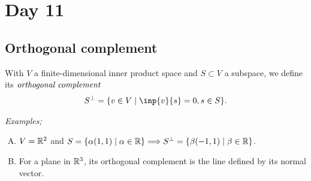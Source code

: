 
\pagebreak
\section{Day 11}

\subsection{Orthogonal complement}

\begin{definition}
  With $V$ a finite-dimensional inner product space and $S\subset V$ a subspace, we define its $\emph{orthogonal complement}$
  \begin{align*}
    S^\perp = \{v\in V \mid \inp{v}{s} = 0, s\in S\}.
  \end{align*}
\end{definition}


\emph{Examples;}
\begin{enumerate}[(A)]
  \item $V=\mathbb{R}^2$ and $S=\{\alpha(1,1) \mid \alpha\in\mathbb{R}\} \Longrightarrow S^\perp = \{\beta(-1,1) \mid \beta\in\mathbb{R}\}$.
  \item For a plane in $\mathbb{R}^3$, its orthogonal complement is the line defined by its normal vector.
\end{enumerate}



